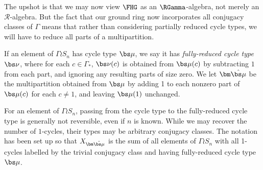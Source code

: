 The upshot is that we may now view $\FHG$ as an $\RGamma$-algebra, not merely an $\mathcal{R}$-algebra. But the fact that our ground ring now incorporates all conjugacy classes of $\Gamma$ means that rather than considering partially reduced cycle types, we will have to reduce all parts of a multipartition.
\begin{definition}
If an element of $\Gamma \wr S_n$ has cycle type $\bs \mu$, we say it has \emph{fully-reduced cycle type} $\bs \nu$, where for each $c \in \Gamma_*$, $\bs \nu(c)$ is obtained from $\bs \mu(c)$ by subtracting $1$ from each part, and ignoring any resulting parts of size zero. We let $\bm\hat{\bs \mu}$ be the multipartition obtained from $\bs \mu$ by adding 1 to each nonzero part of $\bs \mu(c)$ for each $c \neq 1$, and leaving $\bs \mu(1)$ unchanged.
\end{definition}

For an element of $\Gamma \wr S_n$, passing from the cycle type to the fully-reduced cycle type is generally not reversible, even if $n$ is known. While we may recover the number of $1$-cycles, their types may be arbitrary conjugacy classes. The notation has been set up so that $X_{\bm\hat{\bs \mu}}$ is the sum of all elements of $\Gamma \wr S_n$ with all 1-cycles labelled by the trivial conjugacy class and having fully-reduced cycle type $\bs \mu$.


